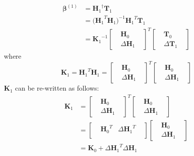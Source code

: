 \documentclass[a4paper, 14pt]{extarticle}
\begin{document}
\begin{equation}
\begin{split}
    \mathbf{\beta}^{(1)}&={\mathbf{H}_1}^\dagger\mathbf{T}_1
    \\&=    
    {(\mathbf{H}_1}^T\mathbf{H}_1)^{-1}{\mathbf{H}_1}^T\mathbf{T}_1
    \\&={\mathbf{K}_1}^{-1}
    \begin{bmatrix}
    &\mathbf{H}_0&\\
    &\Delta\mathbf{H}_1&
    \end{bmatrix}^T
    \begin{bmatrix}
    &\mathbf{T}_0&\\
    &\Delta\mathbf{T}_1&
    \end{bmatrix}
\end{split}
\end{equation}
where
\begin{equation}
    \mathbf{K}_1=
    {\mathbf{H}_1}^T\mathbf{H}_1=
    \begin{bmatrix}
    &\mathbf{H}_0&\\
    &\Delta\mathbf{H}_1&
    \end{bmatrix}^T
    \begin{bmatrix}
    &\mathbf{H}_0&\\
    &\Delta\mathbf{H}_1&
    \end{bmatrix}
\end{equation}
\(\mathbf{K}_1\) can be re-written as follows:
\begin{equation}
\begin{split}
    \mathbf{K}_1 &= \begin{bmatrix}
    &\mathbf{H}_0&\\
    &\Delta\mathbf{H}_1&
    \end{bmatrix}^T
    \begin{bmatrix}
    &\mathbf{H}_0&\\
    &\Delta\mathbf{H}_1&
    \end{bmatrix}
    \\&=
    \begin{bmatrix}
    &{\mathbf{H}_0}^T& {\Delta\mathbf{H}_1}^T&\\
    \end{bmatrix}
    \begin{bmatrix}
    &\mathbf{H}_0&\\
    &\Delta\mathbf{H}_1&
    \end{bmatrix}
    \\&=\mathbf{K}_0+{\Delta\mathbf{H}_1}^{T}\Delta\mathbf{H}_1
\end{split}
\end{equation}
\end{document}
